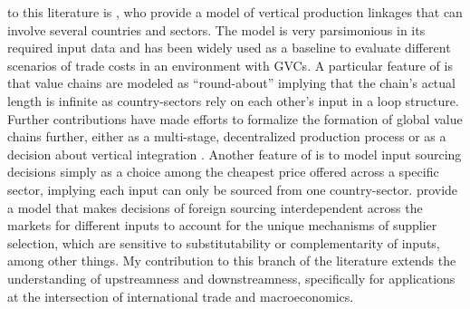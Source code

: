 to this literature is \textcite{caliendo2015EstimatesTradeWelfare}, who provide a model of vertical production linkages that can involve 
several countries and sectors. The model is very parsimonious in its required input data and has been widely used as a baseline to evaluate 
different scenarios of trade costs in an environment with GVCs. A particular feature of \textcite{caliendo2015EstimatesTradeWelfare} is 
that value chains are modeled as ``round-about'' implying that the chain's actual length is infinite as country-sectors rely on each 
other's input in a loop structure. Further contributions have made efforts to formalize the formation of global value chains further, 
either as a multi-stage, decentralized production process \parencite{antras2020GeographyGlobalValue} or as a decision about vertical 
integration \parencite{fally2018CoasianModelInternational}. Another feature of \textcite{caliendo2015EstimatesTradeWelfare} is to model input 
sourcing decisions simply as a choice among the cheapest price offered across a specific sector, implying each input can only be sourced from
one country-sector. \textcite{antras2017MarginsGlobalSourcing} provide a model that makes decisions of foreign sourcing interdependent across
the markets for different inputs to account for the unique mechanisms of supplier selection, which are sensitive to substitutability or 
complementarity of inputs, among other things. My contribution to this branch of the literature extends the understanding of upstreamness and 
downstreamness, specifically for applications at the intersection of international trade and macroeconomics. \\

